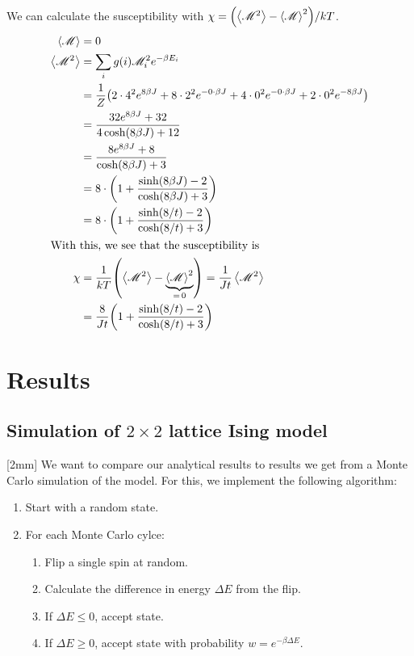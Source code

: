 \documentclass[12pt,a4paper]{article}
\newcommand\M[1]{\begin{bmatrix} #1 \end{bmatrix}} %
\def\M{\mathscr{M}}
\newcommand\oppg[1]{\reversemarginnote{\textcolor{black!40}{#1)}}[2mm]}
\begin{document}
We can calculate the susceptibility with $\chi = \qty( \expval{\M^2} - \expval{\M}^2 ) / k T$.
\begin{align}
  \expval{\M} &= 0 \\
  \expval{\M^2} &= \sum_i g(i) \M_i^2 e^{- \beta E_i} \\
    &= \frac{1}{Z} \qty( 2 \cdot 4^2 e^{8 \beta J} + 8 \cdot 2^2 e^{- 0 \cdot \beta J } + 4 \cdot 0^2 e^{-0 \cdot \beta J} + 2 \cdot 0^2 e^{-8 \beta J} ) \\
    &= \frac{32 e^{8 \beta J} + 32}{4 \cosh(8 \beta J) + 12} \\
    &= \frac{8 e^{8 \beta J} + 8}{\cosh(8 \beta J) + 3} \\
    &= 8 \cdot \qty( 1 + \frac{\sinh(8 \beta J) - 2}{\cosh(8 \beta J) + 3} ) \\
    &= 8 \cdot \qty( 1 + \frac{\sinh(8/t) - 2}{\cosh(8/t) + 3} ) \\
\intertext{With this, we see that the susceptibility is}
  \chi &= \frac{1}{k T} \qty( \expval{\M^2} - \underbrace{\expval{\M}^2}_{= \, 0} ) = \frac{1}{Jt} \expval{\M^2} \\
    &= \frac{8}{J t} \qty( 1 + \frac{\sinh(8/t) - 2}{\cosh(8/t) + 3} )
\end{align}

\clearpage
\section{Results}

\subsection{Simulation of $2 \times 2$ lattice Ising model}

\oppg{b}
We want to compare our analytical results to results we get from a Monte Carlo simulation of the model.
For this, we implement the following algorithm:

\begin{enumerate}
  \item Start with a random state.
  \item For each Monte Carlo cylce:
    \begin{enumerate}
      \item Flip a single spin at random.
      \item Calculate the difference in energy $\Delta{E}$ from the flip.
      \item If $\Delta{E} \le 0$, accept state.
      \item If $\Delta{E} \ge 0$, accept state with probability $w = e^{-\beta \Delta{E}}$.
    \end{enumerate}
\end{enumerate}
\end{document}
